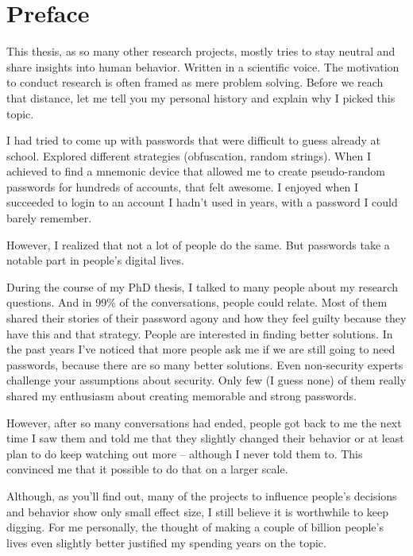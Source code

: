 \section*{Preface}\label{preface}
This thesis, as so many other research projects, mostly tries to stay neutral and share insights into human behavior. Written in a scientific voice. The motivation to conduct research is often framed as mere problem solving. Before we reach that distance, let me tell you my personal history and explain why I picked this topic. 

I had tried to come up with passwords that were difficult to guess already at school. Explored different strategies (obfuscation, random strings). When I achieved to find a mnemonic device that allowed me to create pseudo-random passwords for hundreds of accounts, that felt awesome. I enjoyed when I succeeded to login to an account I hadn't used in years, with a password I could barely remember.  

However, I realized that not a lot of people do the same. But passwords take a notable part in people's digital lives. 

During the course of my PhD thesis, I talked to many people about my research questions. And in 99\% of the conversations, people could relate. Most of them shared their stories of their password agony and how they feel guilty because they have this and that strategy. People are interested in finding better solutions. In the past years I've noticed that more people ask me if we are still going to need passwords, because there are so many better solutions. Even non-security experts challenge your assumptions about security. Only few (I guess none) of them really shared my enthusiasm about creating memorable and strong passwords. 

However, after so many conversations had ended, people got back to me the next time I saw them and told me that they slightly changed their behavior or at least plan to do keep watching out more -- although I never told them to. This convinced me that it possible to do that on a larger scale. 

Although, as you'll find out, many of the projects to influence people's decisions and behavior show only small effect size, I still believe it is worthwhile to keep digging. For me personally, the thought of making a couple of billion people's lives even slightly better justified my spending years on the topic. 


